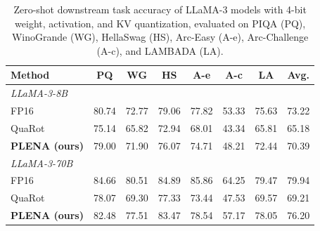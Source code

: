 \begin{table}[t]
    \centering
    \footnotesize
    \setlength{\tabcolsep}{3.5pt}
    \caption{Zero-shot downstream task accuracy of LLaMA-3 models with 4-bit weight, activation, and KV quantization, evaluated on PIQA (PQ), WinoGrande (WG), HellaSwag (HS), Arc-Easy (A-e), Arc-Challenge (A-c), and LAMBADA (LA).}
    \begin{tabular}{l|cccccc|c}
        \toprule
        \textbf{Method} & \textbf{PQ} & \textbf{WG} & \textbf{HS} & \textbf{A-e} & \textbf{A-c} & \textbf{LA} & \textbf{Avg.} \\
        \midrule
        \multicolumn{8}{l}{\textit{LLaMA-3-8B}} \\
        \quad FP16                 & 80.74 & 72.77 & 79.06 & 77.82 & 53.33 & 75.63 & 73.22 \\
        \quad QuaRot~\cite{QuaRot} & 75.14 & 65.82 & 72.94 & 68.01 & 43.34 & 65.81 & 65.18 \\
        \quad \textbf{PLENA (ours)}&79.00  & 71.90 & 76.07 & 74.71 &  48.21 & 72.44 & 70.39 \\
        \midrule
        \multicolumn{8}{l}{\textit{LLaMA-3-70B}} \\
        \quad   FP16   & 84.66 & 80.51 & 84.89 & 85.86 & 64.25 & 79.47 & 79.94 \\
        \quad  QuaRot & 78.07 & 69.30 & 77.33 & 73.44 & 47.53 & 69.57 & 69.21 \\
        \quad  \textbf{PLENA (ours)} &   82.48 &  77.51 &  83.47  & 78.54   &  57.17   &  78.05   &   76.20   \\
        \bottomrule
    \end{tabular}
    \label{tab:zero_shot_combined}
\end{table}



